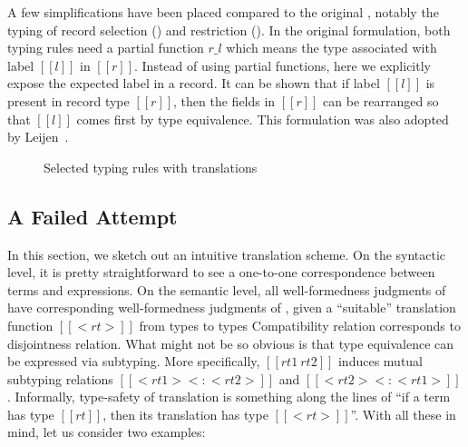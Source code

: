 \begin{remark}
  A few simplifications have been placed compared to the original \rname,
  notably the typing of record selection () and restriction
  (). In the original formulation, both typing rules need a
  partial function $ r \_ l $ which means the type associated with label $[[l]]$
  in $[[r]]$. Instead of using partial functions, here we explicitly expose the
  expected label in a record. It can be shown that if label $[[l]]$ is present
  in record type $[[r]]$, then the fields in $[[r]]$ can be rearranged so that
  $[[l]]$ comes first by type equivalence. This formulation was also adopted by
  Leijen~\cite{leijen2005extensible}.
\end{remark}


\begin{figure}[t]
  \centering
{}
\caption{Selected typing rules with translations}
\label{fig:typing_rname}
\end{figure}



\renewcommand{\rulehl}[1]{#1}

\subsection{A Failed Attempt}
\label{sec:trouble}

In this section, we sketch out an intuitive translation scheme.
On the syntactic level, it is pretty straightforward to see a one-to-one
correspondence between \rname terms and \fnamee expressions. %
On the semantic level, all well-formedness judgments of \rname have corresponding well-formedness judgments
of \fnamee, given a ``suitable'' translation function $[[< rt >]]$ from \rname types to \fnamee types
Compatibility relation corresponds to disjointness relation. What might not be
so obvious is that type equivalence can be expressed via subtyping. More
specifically, $[[ rt1 ~ rt2 ]]$ induces mutual subtyping relations
$[[ < rt1 > <: < rt2 > ]]$ and $[[ < rt2 > <: < rt1 > ]]$.
Informally, type-safety of translation is something along the lines of
``if a term has type $[[rt]]$, then its translation has type $[[< rt > ]]$''.
With all these in mind, let us consider two examples:


